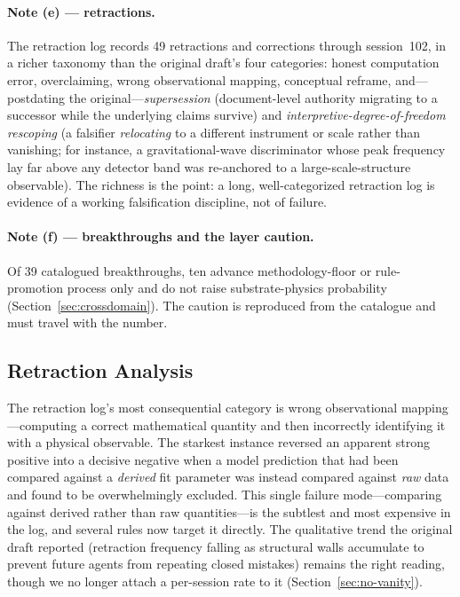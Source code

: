 \documentclass[12pt,a4paper]{article}
\begin{document}
\paragraph{Note (e) --- retractions.} The retraction log records 49 retractions and corrections through session~102, in a richer taxonomy than the original draft's four categories: honest computation error, overclaiming, wrong observational mapping, conceptual reframe, and---postdating the original---\emph{supersession} (document-level authority migrating to a successor while the underlying claims survive) and \emph{interpretive-degree-of-freedom rescoping} (a falsifier \emph{relocating} to a different instrument or scale rather than vanishing; for instance, a gravitational-wave discriminator whose peak frequency lay far above any detector band was re-anchored to a large-scale-structure observable). The richness is the point: a long, well-categorized retraction log is evidence of a working falsification discipline, not of failure.

\paragraph{Note (f) --- breakthroughs and the layer caution.} Of 39 catalogued breakthroughs, ten advance methodology-floor or rule-promotion process only and do not raise substrate-physics probability (Section~\ref{sec:crossdomain}). The caution is reproduced from the catalogue and must travel with the number.

\subsection{Retraction Analysis}

The retraction log's most consequential category is wrong observational mapping---computing a correct mathematical quantity and then incorrectly identifying it with a physical observable. The starkest instance reversed an apparent strong positive into a decisive negative when a model prediction that had been compared against a \emph{derived} fit parameter was instead compared against \emph{raw} data and found to be overwhelmingly excluded. This single failure mode---comparing against derived rather than raw quantities---is the subtlest and most expensive in the log, and several rules now target it directly. The qualitative trend the original draft reported (retraction frequency falling as structural walls accumulate to prevent future agents from repeating closed mistakes) remains the right reading, though we no longer attach a per-session rate to it (Section~\ref{sec:no-vanity}).
\end{document}
